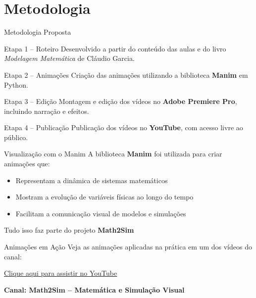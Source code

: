 \section{Metodologia}

\begin{frame}{Metodologia Proposta}

\begin{block}{Etapa 1 – Roteiro}
Desenvolvido a partir do conteúdo das aulas e do livro \textit{Modelagem Matemática} de Cláudio Garcia.
\end{block}

\begin{block}{Etapa 2 – Animações}
Criação das animações utilizando a biblioteca \textbf{Manim} em Python.
\end{block}

\begin{block}{Etapa 3 – Edição}
Montagem e edição dos vídeos no \textbf{Adobe Premiere Pro}, incluindo narração e efeitos.
\end{block}

\begin{block}{Etapa 4 – Publicação}
Publicação dos vídeos no \textbf{YouTube}, com acesso livre ao público.
\end{block}

\end{frame}

\begin{frame}{Visualização com o Manim}
A biblioteca \textbf{Manim} foi utilizada para criar animações que:
\begin{itemize}
    \item Representam a dinâmica de sistemas matemáticos
    \item Mostram a evolução de variáveis físicas ao longo do tempo
    \item Facilitam a comunicação visual de modelos e simulações
\end{itemize}

\vspace{0.5cm}
Tudo isso faz parte do projeto \textbf{Math2Sim} 
\end{frame}

\begin{frame}{Animações em Ação}
Veja as animações aplicadas na prática em um dos vídeos do canal:

\vspace{0.5cm}
\href{https://youtu.be/LjSLiMCvenU}{\color{blue}\underline{Clique aqui para assistir no YouTube}}

\vspace{0.5cm}
\textbf{Canal: Math2Sim – Matemática e Simulação Visual}
\end{frame}

